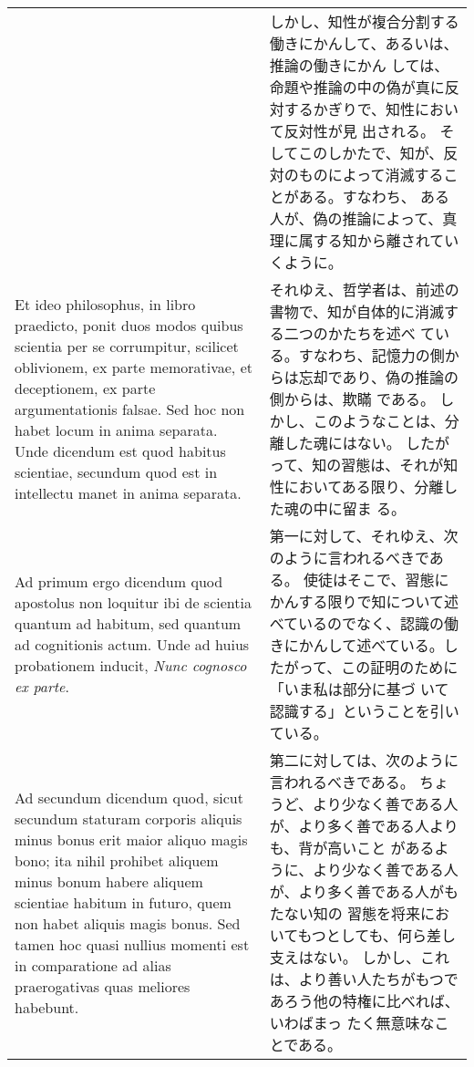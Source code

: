 \documentclass[10pt]{jsarticle} %
\begin{document}
\begin{longtable}{p{21em}p{21em}}
&

しかし、知性が複合分割する働きにかんして、あるいは、推論の働きにかん
しては、命題や推論の中の偽が真に反対するかぎりで、知性において反対性が見
 出される。
そしてこのしかたで、知が、反対のものによって消滅することがある。すなわち、
 ある人が、偽の推論によって、真理に属する知から離されていくように。


\\


Et ideo philosophus, in
libro praedicto, ponit duos modos quibus scientia per se corrumpitur,
scilicet oblivionem, ex parte memorativae, et deceptionem, ex parte
argumentationis falsae. Sed hoc non habet locum in anima separata. Unde
dicendum est quod habitus scientiae, secundum quod est in intellectu
manet in anima separata.

&

それゆえ、哲学者は、前述の書物で、知が自体的に消滅する二つのかたちを述べ
 ている。すなわち、記憶力の側からは忘却であり、偽の推論の側からは、欺瞞
 である。
しかし、このようなことは、分離した魂にはない。
したがって、知の習態は、それが知性においてある限り、分離した魂の中に留ま
 る。

\\


{\sc Ad primum ergo dicendum} quod apostolus non
loquitur ibi de scientia quantum ad habitum, sed quantum ad cognitionis
actum. Unde ad huius probationem inducit, {\it Nunc cognosco ex parte}.


&

第一に対して、それゆえ、次のように言われるべきである。
使徒はそこで、習態にかんする限りで知について述べているのでなく、認識の働
 きにかんして述べている。したがって、この証明のために「いま私は部分に基づ
 いて認識する」ということを引いている。

\\


{\sc Ad secundum dicendum} quod, sicut secundum
staturam
 corporis aliquis minus bonus erit maior aliquo magis
bono; ita nihil prohibet aliquem minus bonum habere aliquem scientiae
habitum in futuro, quem non habet aliquis magis bonus. Sed tamen hoc
quasi nullius momenti est in comparatione ad alias praerogativas quas
meliores habebunt.


&

第二に対しては、次のように言われるべきである。
ちょうど、より少なく善である人が、より多く善である人よりも、背が高いこと
 があるように、より少なく善である人が、より多く善である人がもたない知の
 習態を将来においてもつとしても、何ら差し支えはない。
しかし、これは、より善い人たちがもつであろう他の特権に比べれば、いわばまっ
 たく無意味なことである。


\end{longtable}
\end{document}

